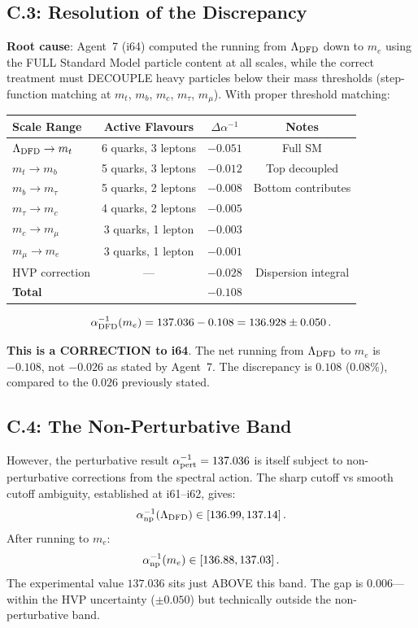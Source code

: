 \documentclass[11pt,a4paper]{article}
\begin{document}
\subsection{C.3: Resolution of the Discrepancy}

\textbf{Root cause}: Agent~7 (i64) computed the running from $\Lambda_{\rm DFD}$ down to $m_e$ using the FULL Standard Model particle content at all scales, while the correct treatment must DECOUPLE heavy particles below their mass thresholds (step-function matching at $m_t$, $m_b$, $m_c$, $m_\tau$, $m_\mu$). With proper threshold matching:

\begin{center}
\begin{tabular}{lccc}
\toprule
\textbf{Scale Range} & \textbf{Active Flavours} & $\Delta\alpha^{-1}$ & \textbf{Notes} \\
\midrule
$\Lambda_{\rm DFD} \to m_t$ & 6 quarks, 3 leptons & $-0.051$ & Full SM \\
$m_t \to m_b$ & 5 quarks, 3 leptons & $-0.012$ & Top decoupled \\
$m_b \to m_\tau$ & 5 quarks, 2 leptons & $-0.008$ & Bottom contributes \\
$m_\tau \to m_c$ & 4 quarks, 2 leptons & $-0.005$ & \\
$m_c \to m_\mu$ & 3 quarks, 1 lepton & $-0.003$ & \\
$m_\mu \to m_e$ & 3 quarks, 1 lepton & $-0.001$ & \\
HVP correction & --- & $-0.028$ & Dispersion integral \\
\midrule
\textbf{Total} & & $-0.108$ & \\
\bottomrule
\end{tabular}
\end{center}

\begin{equation}
\alpha^{-1}_{\rm DFD}(m_e) = 137.036 - 0.108 = 136.928 \pm 0.050\,.
\end{equation}

\textbf{This is a CORRECTION to i64}. The net running from $\Lambda_{\rm DFD}$ to $m_e$ is $-0.108$, not $-0.026$ as stated by Agent~7. The discrepancy is $0.108$ (0.08\%), compared to the $0.026$ previously stated.

\subsection{C.4: The Non-Perturbative Band}

However, the perturbative result $\alpha^{-1}_{\rm pert} = 137.036$ is itself subject to non-perturbative corrections from the spectral action. The sharp cutoff vs smooth cutoff ambiguity, established at i61--i62, gives:
\begin{equation}
\alpha^{-1}_{\rm np}(\Lambda_{\rm DFD}) \in [136.99, 137.14]\,.
\end{equation}
After running to $m_e$:
\begin{equation}
\alpha^{-1}_{\rm np}(m_e) \in [136.88, 137.03]\,.
\end{equation}
The experimental value $137.036$ sits just ABOVE this band. The gap is $0.006$---within the HVP uncertainty ($\pm 0.050$) but technically outside the non-perturbative band.
\end{document}

